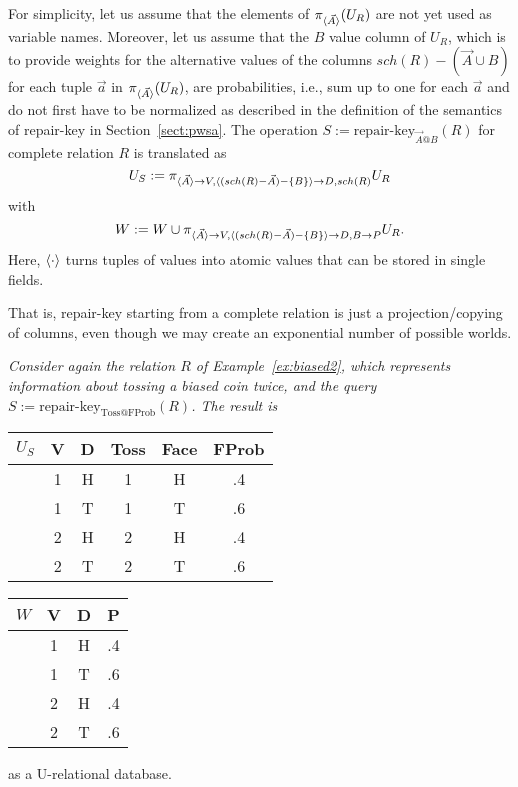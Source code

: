 For simplicity, let us assume that the elements of $\pi_{\langle \vec{A} \rangle}(U_R)$ are not yet used
as variable names. Moreover, let us assume that the $B$ value column of $U_R$, which is to provide weights for the alternative values of the columns $sch(R) - (\vec{A} \cup B)$ for each tuple $\vec{a}$ in
$\pi_{\langle \vec{A} \rangle}(U_R)$, are probabilities, i.e., sum up to one for each $\vec{a}$ and do not first have to be normalized as described in the definition of the semantics of repair-key in Section~\ref{sect:pwsa}.
The operation $S := \mbox{repair-key}_{\vec{A}@B}(R)$ for complete relation $R$ is translated as
\[
U_S := \pi_{\langle \vec{A} \rangle \rightarrow V, \langle (sch(R)-\vec{A}) - \{B\} \rangle \rightarrow D, sch(R)} U_R
\]
with
\[
W := W \cup \pi_{\langle \vec{A} \rangle \rightarrow V,
                 \langle (sch(R) - \vec{A}) - \{B\} \rangle \rightarrow D,
                 B \rightarrow P} U_R.
\]
Here, $\langle \cdot \rangle$ turns tuples of values into atomic values that can be
stored in single fields.

That is, repair-key starting from a complete relation is just a
projection/copying of columns, even though we may create an
exponential number of possible worlds.



\begin{example}\em
Consider again the relation $R$ of Example~\ref{ex:biased2}, which represents information about tossing a biased coin twice, and the query
%
$S := \mbox{repair-key}_{\mathrm{Toss}@\mathrm{FProb}}(R)$.
The result is
%
\begin{center}
\begin{tabular}{c|cc|ccc}
\hline
$U_S$ & V & D & Toss & Face & FProb \\
\hline
 & 1 & H & 1 & H & .4 \\
 & 1 & T & 1 & T & .6 \\
 & 2 & H & 2 & H & .4 \\
 & 2 & T & 2 & T & .6 \\
\end{tabular}
\hspace{5mm}
\begin{tabular}{c|ccc}
\hline
$W$ & V & D & P \\
\hline
 & 1 & H & .4 \\
 & 1 & T & .6 \\
 & 2 & H & .4 \\
 & 2 & T & .6 \\
\end{tabular}
\end{center}
as a U-relational database.
\punto
\end{example}


